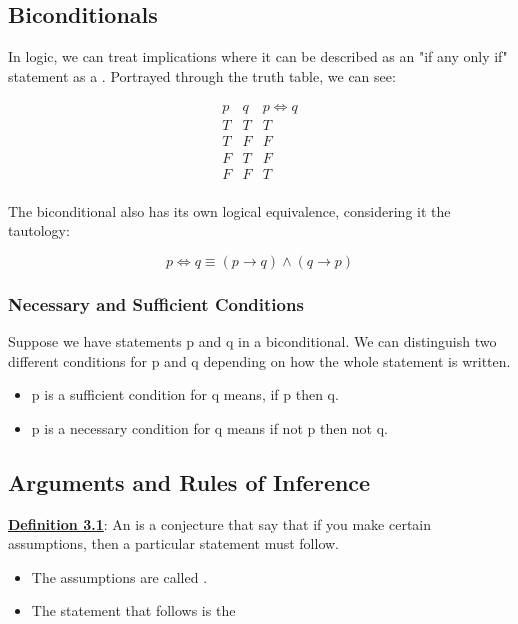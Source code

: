 \subsection{Biconditionals}
In logic, we can treat implications where it can be described as an "if any only if" statement as a . Portrayed through the truth table, we can see:

\begin{displaymath}
    \begin{array}{|c|c|c|}
    p & q & p \iff q\\ 
    \hline
    T & T & T\\
    T & F & F\\
    F & T & F\\
    F & F & T\\
    \end{array}
\end{displaymath}

The biconditional also has its own logical equivalence, considering it the tautology:

\begin{displaymath}
    p \iff q \equiv (p \rightarrow q) \land (q \rightarrow p)
\end{displaymath}

\subsubsection{Necessary and Sufficient Conditions}
Suppose we have statements p and q in a biconditional. We can distinguish two different conditions for p and q depending on how the whole statement is written.

\begin{itemize}
    \item p is a sufficient condition for q means, if p then q.
    \item p is a necessary condition for q means if not p then not q.
\end{itemize}

\subsection{Arguments and Rules of Inference}
\textbf{\underline{Definition 3.1}}: An  is a conjecture that say that if you make certain assumptions, then a particular statement must follow.

\begin{itemize}
    \item The assumptions are called .
    \item The statement that follows is the 
\end{itemize}

